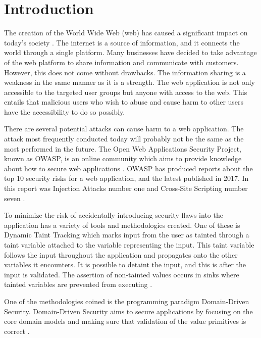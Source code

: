\chapter{Introduction}
\label{Introduction}
The creation of the World Wide Web (web) has caused a significant impact on today's society \parencite{www}. The internet is a source of information, and it connects the world through a single platform. Many businesses have decided to take advantage of the web platform to share information and communicate with customers. However, this does not come without drawbacks. The information sharing is a weakness in the same manner as it is a strength. The web application is not only accessible to the targeted user groups but anyone with access to the web. This entails that malicious users who wish to abuse and cause harm to other users have the accessibility to do so possibly.

There are several potential attacks can cause harm to a web application. The attack most frequently conducted today will probably not be the same as the most performed in the future. The Open Web Applications Security Project, known as OWASP, is an online community which aims to provide knowledge about how to secure web applications \parencite{OpenWebApplicationSecurityProject}. OWASP has produced reports about the top 10 security risks for a web application, and the latest published in 2017. In this report was Injection Attacks number one and Cross-Site Scripting number seven \parencite{OWASP2017, OpenWebApplicationSecurityProject, CrossMichael2007Dgtw}.

To minimize the risk of accidentally introducing security flaws into the application has a variety of tools and methodologies created. One of these is Dynamic Taint Tracking which marks input from the user as tainted through a taint variable attached to the variable representing the input. This taint variable follows the input throughout the application and propagates onto the other variables it encounters. It is possible to detaint the input, and this is after the input is validated. The assertion of non-tainted values occurs in sinks where tainted variables are prevented from executing \parencite{Pan2015, Venkataramani2008}. 

One of the methodologies coined is the programming paradigm Domain-Driven Security. Domain-Driven Security aims to secure applications by focusing on the core domain models and making sure that validation of the value primitives is correct \parencite{Wilander2009, Johnsson2009}.

